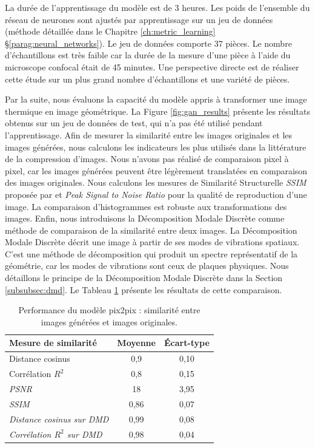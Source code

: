 La durée de l'apprentissage du modèle est de 3 heures.
Les poids de l'ensemble du réseau de neurones sont ajustés par apprentissage sur un jeu de données (méthode détaillée dans le Chapitre \ref{ch:metric_learning} §\ref{parag:neural_networks}).
Le jeu de données comporte 37 pièces.
Le nombre d'échantillons est très faible car la durée de la mesure d'une pièce à l'aide du microscope confocal était de 45 minutes.
Une perspective directe est de réaliser cette étude sur un plus grand nombre d'échantillons et une variété de pièces.

Par la suite, nous évaluons la capacité du modèle appris à transformer une image thermique en image géométrique.
La Figure \ref{fig:gan_results} présente les résultats obtenus sur un jeu de données de test, qui n'a pas été utilisé pendant l'apprentissage.
Afin de mesurer la similarité entre les images originales et les images générées, nous calculons les indicateurs les plus utilisés dans la littérature de la compression d'images.
Nous n'avons pas réalisé de comparaison pixel à pixel, car les images générées peuvent être légèrement translatées en comparaison des images originales.
Nous calculons les mesures de Similarité Structurelle \textit{SSIM} proposée par \citeauthor{wang_image_2004} \cite{wang_image_2004} et \textit{Peak Signal to Noise Ratio} pour la qualité de reproduction d'une image.
La comparaison d'histogrammes est robuste aux transformations des images.
Enfin, nous introduisons la Décomposition Modale Discrète comme méthode de comparaison de la similarité entre deux images.
La Décomposition Modale Discrète décrit une image à partir de ses modes de vibrations spatiaux.
C'est une méthode de décomposition qui produit un spectre représentatif de la géométrie, car les modes de vibrations sont ceux de plaques physiques.
Nous détaillons le principe de la Décomposition Modale Discrète dans la Section \ref{subsubsec:dmd}.
Le Tableau \ref{tab:gan_results} présente les résultats de cette comparaison.

\begin{table}[tbhp]
	\centering
	\begin{tabular}{|l|c|c|}
		\arrayrulecolor{black}
		\hline
		Mesure de similarité & Moyenne & Écart-type \\
		\hline
		\hline
		Distance cosinus & 0,9 & 0,10 \\ \hline
		\hline
		Corrélation $R^2$ & 0,8 & 0,15 \\ \hline
		\textit{PSNR} & 18 & 3,95 \\ \hline
		\textit{SSIM} & 0,86 & 0,07 \\ \hline
		\hline
		\textit{Distance cosinus sur DMD} & 0,99 & 0,08 \\ \hline
		\textit{Corrélation $R^2$ sur DMD} & 0,98 & 0,04 \\ \hline
	\end{tabular}
	\caption{Performance du modèle pix2pix : similarité entre images générées et images originales.}
	\label{tab:gan_results}
\end{table}


